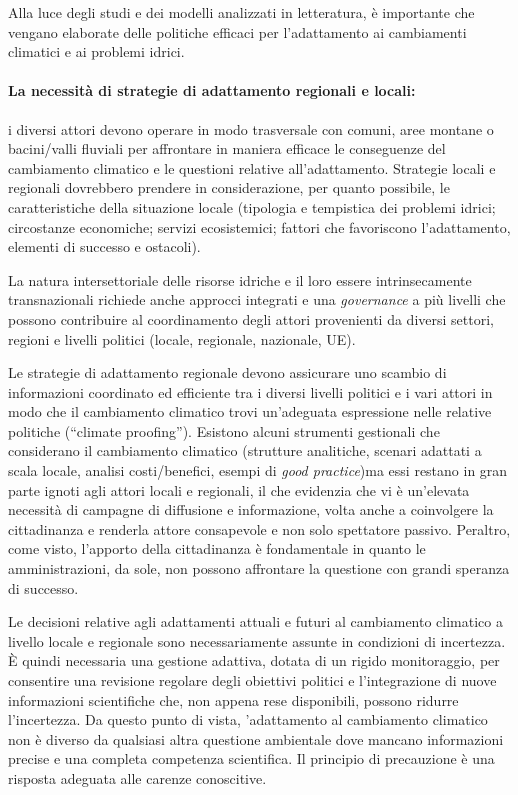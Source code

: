 \documentclass[14pt,a4paper]{article}
\begin{document}
		Alla luce degli studi e dei modelli analizzati in letteratura, è importante che vengano elaborate delle politiche efficaci per l'adattamento
		ai cambiamenti climatici e ai problemi idrici.
		
		\paragraph{La necessità di strategie di adattamento regionali e	locali:}
		
		i diversi attori devono operare in modo trasversale
		con comuni, aree montane o bacini/valli fluviali
		per affrontare in maniera efficace le conseguenze
		del cambiamento climatico e le questioni relative
		all'adattamento. Strategie locali e regionali
		dovrebbero prendere in considerazione, per quanto
		possibile, le caratteristiche della situazione locale
		(tipologia e tempistica dei problemi idrici;
		circostanze economiche; servizi ecosistemici; fattori
		che favoriscono l'adattamento, elementi di successo
		e ostacoli).
		
		La natura intersettoriale delle risorse idriche e il loro essere intrinsecamente transnazionali richiede anche
		approcci integrati e una \textit{governance} a più livelli
		che possono contribuire al coordinamento degli
		attori provenienti da diversi settori, regioni e livelli
		politici (locale, regionale, nazionale, UE).
		
		Le strategie di adattamento regionale devono
		assicurare uno scambio di informazioni coordinato
		ed efficiente tra i diversi livelli politici e i vari
		attori in modo che il cambiamento climatico trovi
		un'adeguata espressione nelle relative politiche
		(``climate proofing''). Esistono alcuni strumenti
		gestionali che considerano il cambiamento climatico
		(strutture analitiche, scenari adattati a scala
		locale, analisi costi/benefici, esempi di \textit{good practice})ma essi restano in gran parte ignoti agli attori locali e regionali, il che evidenzia che vi è un'elevata
		necessità di campagne di diffusione e informazione, volta anche a coinvolgere la cittadinanza e renderla attore consapevole e non solo spettatore passivo. Peraltro, come visto, l'apporto della cittadinanza è fondamentale in quanto le amministrazioni, da sole, non possono affrontare la questione con grandi speranza di successo.
		
		Le decisioni relative agli adattamenti attuali e futuri 	al cambiamento climatico a livello locale e regionale sono necessariamente assunte in condizioni di incertezza. \`{E} quindi necessaria una gestione adattiva, dotata di un rigido monitoraggio, per consentire una revisione regolare degli obiettivi politici e l'integrazione di nuove informazioni scientifiche che, non appena rese disponibili, possono ridurre l'incertezza. Da questo punto di vista, 'adattamento al cambiamento climatico non è diverso da qualsiasi altra questione ambientale dove mancano informazioni precise e una completa competenza scientifica. Il principio di precauzione
		è una risposta adeguata alle carenze conoscitive. 
		
\end{document}
